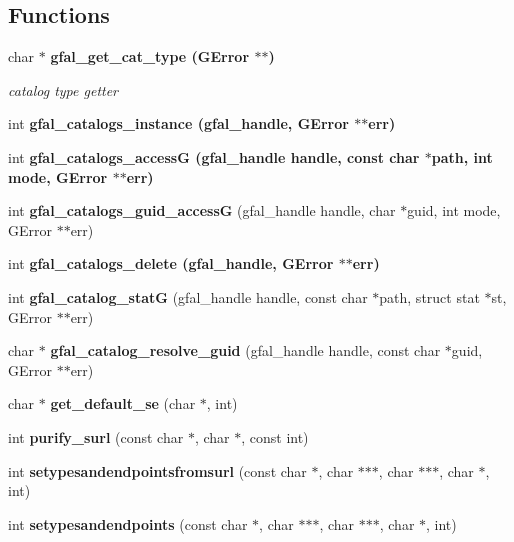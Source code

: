 \subsection*{Functions}
\begin{CompactItemize}
\item 
char $\ast$ \bf{gfal\_\-get\_\-cat\_\-type} (GError $\ast$$\ast$)
\begin{CompactList}\small\item\em catalog type getter \item\end{CompactList}\item 
int \bf{gfal\_\-catalogs\_\-instance} (gfal\_\-handle, GError $\ast$$\ast$err)
\item 
int \bf{gfal\_\-catalogs\_\-access\-G} (gfal\_\-handle handle, const char $\ast$path, int mode, GError $\ast$$\ast$err)
\item 
int \textbf{gfal\_\-catalogs\_\-guid\_\-access\-G} (gfal\_\-handle handle, char $\ast$guid, int mode, GError $\ast$$\ast$err)\label{gfal__common__catalog_8h_fdd144370f8c6df2564eaddbf26e2fd5}

\item 
int \bf{gfal\_\-catalogs\_\-delete} (gfal\_\-handle, GError $\ast$$\ast$err)
\item 
int \textbf{gfal\_\-catalog\_\-stat\-G} (gfal\_\-handle handle, const char $\ast$path, struct stat $\ast$st, GError $\ast$$\ast$err)\label{gfal__common__catalog_8h_28ca68c00e4a67bc158975ef3e4f8013}

\item 
char $\ast$ \textbf{gfal\_\-catalog\_\-resolve\_\-guid} (gfal\_\-handle handle, const char $\ast$guid, GError $\ast$$\ast$err)\label{gfal__common__catalog_8h_4955825d7c275f3dfae9a57232642370}

\item 
char $\ast$ \textbf{get\_\-default\_\-se} (char $\ast$, int)\label{gfal__common__catalog_8h_c304a754c49bedeec6c1c9b1445b937d}

\item 
int \textbf{purify\_\-surl} (const char $\ast$, char $\ast$, const int)\label{gfal__common__catalog_8h_c25d6ed82e636c14d640318a2ad5f3b5}

\item 
int \textbf{setypesandendpointsfromsurl} (const char $\ast$, char $\ast$$\ast$$\ast$, char $\ast$$\ast$$\ast$, char $\ast$, int)\label{gfal__common__catalog_8h_f398c539d03eaea6dcb6b45067cb21f2}

\item 
int \textbf{setypesandendpoints} (const char $\ast$, char $\ast$$\ast$$\ast$, char $\ast$$\ast$$\ast$, char $\ast$, int)\label{gfal__common__catalog_8h_f06de10d100ffd8ad880619661708810}


\end{CompactItemize}
